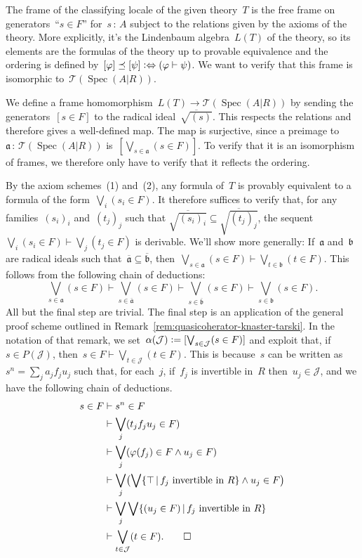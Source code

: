 \documentclass[10pt,reqno,a4paper]{amsbook}
\makeatletter
\theoremstyle{definition}
\theoremstyle{plain}
\theoremstyle{remark}
\newcommand{\T}{\mathcal{T}}
\newcommand{\J}{\mathcal{J}}
\newcommand{\aaa}{\mathfrak{a}}
\newcommand{\bbb}{\mathfrak{b}}
\DeclareMathOperator{\Spec}{Spec}
\newcommand{\Open}{\T}
\newcommand{\?}{\,{:}\,}
\renewcommand{\_}{\mathpunct{.}\,}
\newcommand{\defeq}{\vcentcolon=}
\renewenvironment{proof}[1][\proofname]{\par
  \pushQED{\qed}%
  \normalfont \topsep6\p@\@plus6\p@\relax
  \trivlist
  \item[\hskip\labelsep
        \itshape
    #1\@addpunct{.}]\ignorespaces
}{%
  \popQED\endtrivlist\@endpefalse
}
\makeatother
\begin{document}
\begin{proof}The frame of the classifying locale of the given theory~$T$ is the
free frame on generators~``$s \in F$'' for~$s\?A$ subject to the relations
given by the axioms of the theory. More explicitly, it's the Lindenbaum
algebra~$L(T)$ of the theory, so its elements are the formulas of the theory up
to provable equivalence and the ordering is defined by~$[\varphi] \preceq
[\psi] \vcentcolon\Leftrightarrow (\varphi \vdash \psi)$. We want to verify that this frame is
isomorphic to~$\Open(\Spec(A|R))$.

We define a frame homomorphism~$L(T) \to \Open(\Spec(A|R))$ by sending the
generators~$[s \in F]$ to the radical ideal~$\overline{\sqrt{(s)}}$. This
respects the relations and therefore gives a well-defined map. The map is
surjective, since a preimage to~$\aaa \? \Open(\Spec(A|R))$
is~$[\bigvee_{s\in\aaa} (s \in F)]$. To verify that it is an isomorphism of
frames, we therefore only have to verify that it reflects the ordering.

By the axiom schemes~(1) and~(2), any formula of~$T$ is provably equivalent to
a formula of the form~$\bigvee_i (s_i \in F)$. It therefore suffices to verify
that, for any families~$(s_i)_i$ and~$(t_j)_j$ such that
$\overline{\sqrt{(s_i)_i}} \subseteq \overline{\sqrt{(t_j)_j}}$, the sequent
$\bigvee_i (s_i \in F) \vdash \bigvee_j (t_j \in F)$ is derivable. We'll show
more generally: If~$\aaa$ and~$\bbb$ are radical ideals such
that~$\overline{\aaa} \subseteq \overline{\bbb}$,
then~$\bigvee_{s\in\aaa}(s\in F) \vdash \bigvee_{t\in\bbb}(t\in F)$. This
follows from the following chain of deductions:
\[ \bigvee_{s\in\aaa}(s\in F) \vdash
  \bigvee_{s\in\overline{\aaa}}(s\in F) \vdash
  \bigvee_{s\in\overline{\bbb}}(s\in F) \vdash
  \bigvee_{s\in\bbb}(s\in F). \]
All but the final step are trivial. The final step is an application of the
general proof scheme outlined in
Remark~\ref{rem:quasicoherator-knaster-tarski}. In the notation of that remark,
we set~$\alpha(\J) \defeq [\bigvee_{s\in\J}(s\in F)]$ and exploit that, if~$s
\in P(\J)$, then~$s \in F \vdash \bigvee_{t\in\J} (t \in F)$. This is
because~$s$ can be written as~$s^n = \sum_j a_j f_j u_j$ such that, for each~$j$,
if~$f_j$ is invertible in~$R$ then~$u_j \in \J$, and we have the
following chain of deductions.
\begin{align*}
  s \in F &\vdash s^n \in F \\
  &\vdash \bigvee_j (t_j f_j u_j \in F) \\
  &\vdash \bigvee_j (\varphi(f_j) \in F \wedge u_j \in F) \\
  &\vdash \bigvee_j \bigl(\bigvee\{\top\,|\,\text{$f_j$ invertible in $R$}\} \wedge u_j \in F\bigr) \\
  &\vdash \bigvee_j \bigvee\{(u_j\in F) \,|\, \text{$f_j$ invertible in $R$}\} \\
  &\vdash \bigvee_{t \in \J} (t \in F). \qedhere
\end{align*}
\end{proof}
\end{document}
